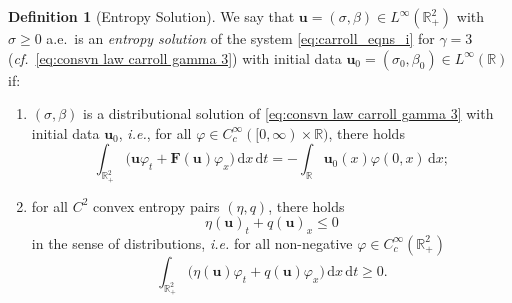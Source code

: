 \documentclass[11pt,a4paper,reqno]{amsart}
\numberwithin{equation}{section}
\theoremstyle{definition}
\newtheorem{definition}[lemma]{Definition}
\theoremstyle{remark}
\newcommand{\bu}{\mathbf{u}}
\newcommand{\bF}{\mathbf{F}}
\renewcommand{\d}{\, \mathrm{d}}
\renewcommand{\leq}{\leqslant}
\renewcommand{\geq}{\geqslant}
\begin{document}
{\begin{definition}[Entropy Solution]\label{def:ent sol}
    We say that $\bu=(\sigma,\beta) \in L^\infty(\mathbb{R}^2_+)$ with $\sigma \geq 0$ a.e.~is an \emph{entropy solution} of the system \eqref{eq:carroll_eqns_i} for $\gamma=3$ (\textit{cf.}~\eqref{eq:consvn law carroll gamma 3}) with initial data $\bu_0=(\sigma_0,\beta_0) \in L^\infty(\mathbb{R})$ if$:$ 
    \begin{enumerate}
        \item[(i)] $(\sigma,\beta)$ is a distributional solution of \eqref{eq:consvn law carroll gamma 3} with initial data $\bu_0$, \textit{i.e.}, for all $\varphi \in C^\infty_c([0,\infty)\times\mathbb{R})$, there holds 
        \begin{equation*}
            \int_{\mathbb{R}^2_+} \big( \bu \varphi_t + \bF(\bu) \varphi_x \big) \d x \d t = -\int_\mathbb{R} \bu_0(x) \varphi(0,x) \d x; 
        \end{equation*}
        \item[(ii)] for all $C^2$ convex entropy pairs $(\eta,q)$, there holds 
        \begin{equation}\label{eq:entropy inequality}
    \eta(\bu)_t + q(\bu)_x \leq 0 
\end{equation}
in the sense of distributions, \textit{i.e.} for all non-negative $\varphi \in C^\infty_c(\mathbb{R}^2_+)$ 
\begin{equation*}
    \int_{\mathbb{R}^2_+} \big( \eta(\bu) \varphi_t + q(\bu) \varphi_x  \big) \d x \d t \geq 0. 
\end{equation*}
    \end{enumerate}
\end{definition}

}
\end{document}
